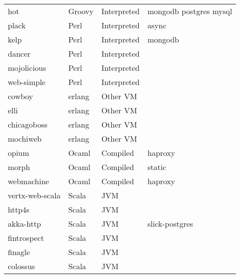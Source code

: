 \begin{longtable}{llll}
    hot              & Groovy & Interpreted      & mongodb postgres mysql                             \\
    plack            & Perl & Interpreted        & async                                              \\
    kelp             & Perl & Interpreted        & mongodb                                            \\
    dancer           & Perl & Interpreted        &                                                    \\
    mojolicious      & Perl & Interpreted        &                                                    \\
    web-simple       & Perl & Interpreted        &                                                    \\
    cowboy           & erlang & Other VM      &                                                    \\
    elli             & erlang & Other VM      &                                                    \\
    chicagoboss      & erlang & Other VM      &                                                    \\
    mochiweb         & erlang & Other VM      &                                                    \\
    opium            & Ocaml & Compiled       & haproxy                                            \\
    morph            & Ocaml & Compiled       & static                                             \\
    webmachine       & Ocaml & Compiled       & haproxy                                            \\
    vertx-web-scala  & Scala & JVM       &                                                    \\
    http4s           & Scala & JVM       &                                                    \\
    akka-http        & Scala & JVM       & slick-postgres                                     \\
    fintrospect      & Scala & JVM       &                                                    \\
    finagle          & Scala & JVM       &                                                    \\
    colossus         & Scala & JVM       &                                                    \\

\end{longtable}

